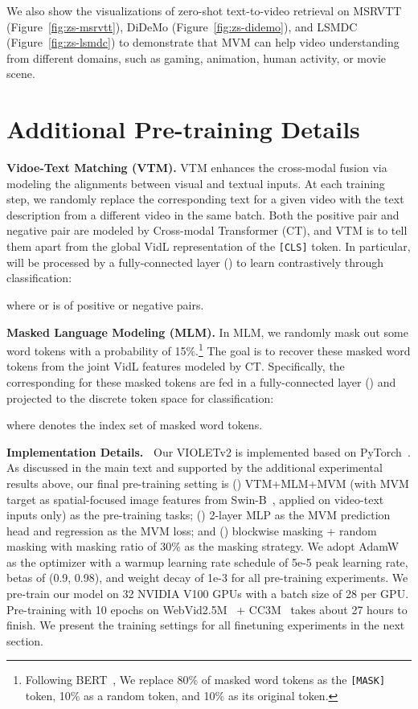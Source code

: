 \documentclass[10pt,twocolumn,letterpaper]{article}
\newcommand{\modelname}{VIOLETv2\xspace}
\begin{document}
We also show the visualizations of zero-shot text-to-video retrieval on MSRVTT (Figure~\ref{fig:zs-msrvtt}), DiDeMo (Figure~\ref{fig:zs-didemo}), and LSMDC (Figure~\ref{fig:zs-lsmdc}) to demonstrate that MVM can help video understanding from different domains, such as gaming, animation, human activity, or movie scene.

\section{Additional Pre-training Details}
\noindent \textbf{Vidoe-Text Matching (VTM).}
VTM enhances the cross-modal fusion via modeling the alignments between visual and textual inputs. At each training step, we randomly replace the corresponding text  for a given video  with the text description  from a different video in the same batch. Both the positive pair  and negative pair  are modeled by Cross-modal Transformer (CT), and VTM is to tell them apart from the global VidL representation  of the \texttt{[CLS]} token. In particular,  will be processed by a fully-connected layer () to learn contrastively through classification:
\vspace{4pt}

where  or  is  of positive or negative pairs. 

\vspace{0.5ex}
\noindent \textbf{Masked Language Modeling (MLM).}
In MLM, we randomly mask out some word tokens with a probability of 15\%.\footnote{Following BERT~\cite{devlin2019bert}, We replace 80\% of masked word tokens as the \texttt{[MASK]} token, 10\% as a random token, and 10\% as its original token.} The goal is to recover these masked word tokens  from the joint VidL features  modeled by CT. Specifically, the corresponding  for these masked tokens are fed in a fully-connected layer () and projected to the discrete token space for classification:
\vspace{4pt}

where  denotes the index set of masked word tokens.

\vspace{0.5ex}
\noindent \textbf{Implementation Details.~}
Our \modelname is implemented based on PyTorch~\cite{paszke2019pytorch}. As discussed in the main text and supported by the additional experimental results above, our final pre-training setting is () VTM+MLM+MVM (with MVM target as spatial-focused image features from Swin-B~\cite{liu2021swin},  applied on video-text inputs only) as the pre-training tasks; () 2-layer MLP as the MVM prediction head and  regression as the MVM loss; and () blockwise masking + random masking with masking ratio of 30\% as the masking strategy. We adopt AdamW~\cite{loshchilov2019adamw} as the optimizer with a warmup learning rate schedule of 5e-5 peak learning rate, betas of (0.9, 0.98), and weight decay of 1e-3 for all pre-training experiments. We pre-train our model on 32 NVIDIA V100 GPUs with a batch size of 28 per GPU.  Pre-training with 10 epochs on WebVid2.5M~\cite{bain2021frozen} + CC3M~\cite{sharma2018cc} takes about 27 hours to finish. We present the training settings for all finetuning experiments in the next section.
\end{document}
